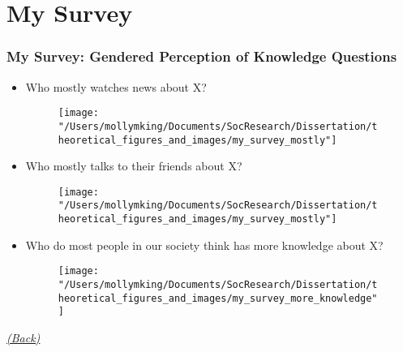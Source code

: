 \documentclass[pdf]{beamer}
\begin{document}
\section{My Survey}
\begin{frame}
\label{my_survey}
\frametitle{My Survey: Gendered Perception of Knowledge Questions}
  \begin{itemize}
    \item
      Who mostly watches news about X?
      \begin{figure}[ht]
        \begin{center}
          \texttt{[image: "/Users/mollymking/Documents/SocResearch/Dissertation/theoretical\_figures\_and\_images/my\_survey\_mostly"]}
        \end{center}
      \end{figure}
    \item
      Who mostly talks to their friends about X?
      \begin{figure}[ht]
        \begin{center}
          \texttt{[image: "/Users/mollymking/Documents/SocResearch/Dissertation/theoretical\_figures\_and\_images/my\_survey\_mostly"]}
        \end{center}
      \end{figure}
    \item
      Who do most people in our society think has more knowledge about X? \\
      \begin{figure}[ht]
        \begin{center}
          \texttt{[image: "/Users/mollymking/Documents/SocResearch/Dissertation/theoretical\_figures\_and\_images/my\_survey\_more\_knowledge"]}
        \end{center}
      \end{figure}
  \end{itemize}
  \begin{flushright}
    \emph{\scriptsize{\textcolor{gray}{\hyperlink{supplemental_slides}{(Back)}}}}
  \end{flushright}
\end{frame}
\end{document}
